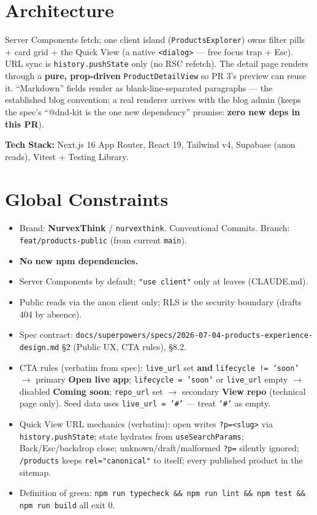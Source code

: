 \documentclass[11pt,a4paper]{article}
\begin{document}
\section{Architecture}

Server Components fetch; one client island (\texttt{ProductsExplorer}) owns filter pills + card
grid + the Quick View (a native \texttt{<dialog>} --- free focus trap + Esc). URL sync is
\texttt{history.pushState} only (no RSC refetch). The detail page renders through a
\textbf{pure, prop-driven} \texttt{ProductDetailView} so PR 3's preview can reuse it. ``Markdown''
fields render as blank-line-separated paragraphs --- the established blog convention; a real
renderer arrives with the blog admin (keeps the spec's ``@dnd-kit is the one new dependency''
promise: \textbf{zero new deps in this PR}).

\textbf{Tech Stack:} Next.js 16 App Router, React 19, Tailwind v4, Supabase (anon reads), Vitest +
Testing Library.

\section{Global Constraints}

\begin{itemize}
  \item Brand: \textbf{NurvexThink} / \texttt{nurvexthink}. Conventional Commits. Branch:
        \texttt{feat/products-public} (from current \texttt{main}).
  \item \textbf{No new npm dependencies.}
  \item Server Components by default; \texttt{"use client"} only at leaves (CLAUDE.md).
  \item Public reads via the anon client only; RLS is the security boundary (drafts 404 by
        absence).
  \item Spec contract: \texttt{docs/superpowers/specs/2026-07-04-products-experience-design.md}
        \S2 (Public UX, CTA rules), \S8.2.
  \item CTA rules (verbatim from spec): \texttt{live\_url} set \textbf{and}
        \texttt{lifecycle != 'soon'} $\rightarrow$ primary \textbf{Open live app};
        \texttt{lifecycle = 'soon'} or \texttt{live\_url} empty $\rightarrow$ disabled
        \textbf{Coming soon}; \texttt{repo\_url} set $\rightarrow$ secondary \textbf{View repo}
        (technical page only). Seed data uses \texttt{live\_url = '\#'} --- treat \texttt{'\#'}
        as empty.
  \item Quick View URL mechanics (verbatim): open writes \texttt{?p=<slug>} via
        \texttt{history.pushState}; state hydrates from \texttt{useSearchParams}; Back/Esc/backdrop
        close; unknown/draft/malformed \texttt{?p=} silently ignored; \texttt{/products} keeps
        \texttt{rel="canonical"} to itself; every published product in the sitemap.
  \item Definition of green: \texttt{npm run typecheck \&\& npm run lint \&\& npm test \&\& npm
        run build} all exit 0.
\end{itemize}
\end{document}
